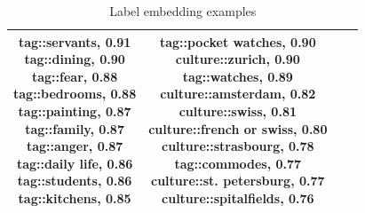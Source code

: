\documentclass[10pt,twocolumn,letterpaper]{article}
\begin{document}
\begin{table}[!t]
\begin{center}
\begin{tabular}{|c|c|c|c|}
\shortstack{
tag::servants, 0.91\\
tag::dining, 0.90\\
tag::fear, 0.88\\
tag::bedrooms, 0.88\\
tag::painting, 0.87\\
tag::family, 0.87\\
tag::anger, 0.87\\
tag::daily life, 0.86\\
tag::students, 0.86\\
tag::kitchens, 0.85}
&
\shortstack{tag::pocket watches, 0.90\\
	culture::zurich, 0.90\\
	tag::watches, 0.89\\
	culture::amsterdam, 0.82\\
	culture::swiss, 0.81\\
	culture::french or swiss, 0.80\\
	culture::strasbourg, 0.78\\
	tag::commodes, 0.77\\
	culture::st. petersburg, 0.77\\
	culture::spitalfields, 0.76}
\\
\hline
		\end{tabular}
\end{center}
\caption{Label embedding examples}
\label{fig:l2v_ex}
\end{table}
\end{document}
